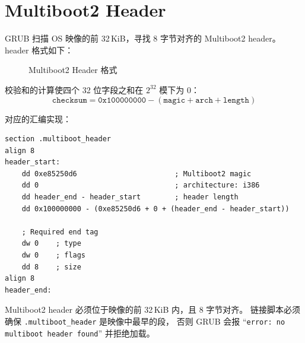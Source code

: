\section{Multiboot2 Header}

GRUB 扫描 OS 映像的前 32\,KiB，寻找 8 字节对齐的 Multiboot2 header。
header 格式如下：

\begin{figure}[H]
  \centering
  
  \caption{Multiboot2 Header 格式}
  \label{fig:mb2-header}
\end{figure}

校验和的计算使四个 32 位字段之和在 $2^{32}$ 模下为 0：
$$\texttt{checksum} = \texttt{0x100000000} - (\texttt{magic} + \texttt{arch} + \texttt{length})$$

对应的汇编实现：

\begin{lstlisting}[style=nasmstyle]
section .multiboot_header
align 8
header_start:
    dd 0xe85250d6                       ; Multiboot2 magic
    dd 0                                ; architecture: i386
    dd header_end - header_start        ; header length
    dd 0x100000000 - (0xe85250d6 + 0 + (header_end - header_start))

    ; Required end tag
    dw 0    ; type
    dw 0    ; flags
    dd 8    ; size
align 8
header_end:
\end{lstlisting}

\begin{warnbox}
Multiboot2 header 必须位于映像的前 32\,KiB 内，且 8 字节对齐。
链接脚本必须确保 \texttt{.multiboot\_header} 是映像中最早的段，
否则 GRUB 会报 ``\texttt{error: no multiboot header found}'' 并拒绝加载。
\end{warnbox}


